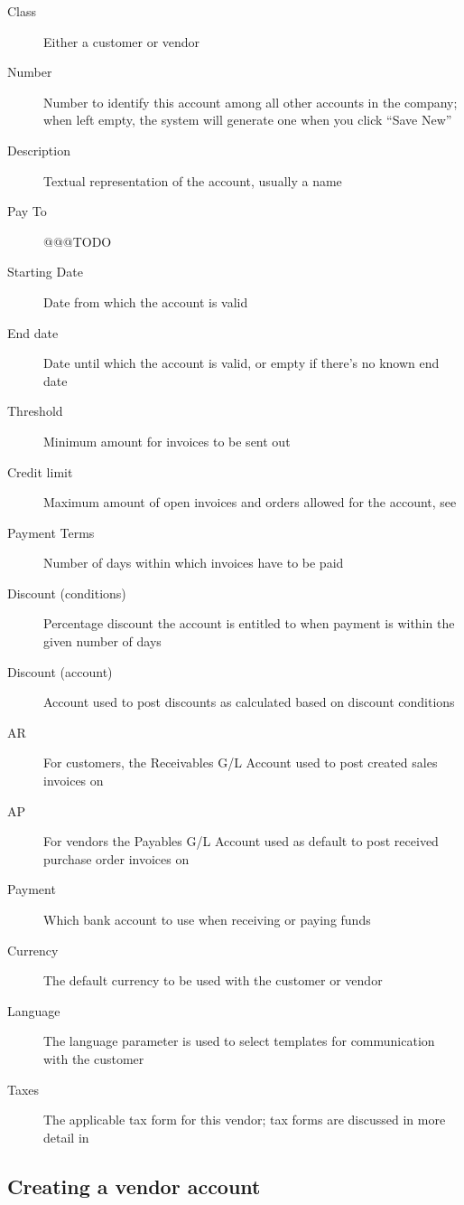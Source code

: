 \begin{description}
\item [Class] Either a \gls{customer} or \gls{vendor} 
\item [Number] Number to identify this account among all other accounts in the company; when left empty, the system will generate one when you click ``Save New''
\item [Description] Textual representation of the account, usually a name
\item [Pay To] @@@TODO
\item [Starting Date] Date from which the account is valid
\item [End date] Date until which the account is valid, or empty if there's no known end date
\item [Threshold] Minimum amount for invoices to be sent out
\item [Credit limit] Maximum amount of open invoices and orders allowed for the account, see 
\item [Payment Terms] Number of days within which invoices have to be paid
\item [Discount (conditions)] Percentage discount the account is entitled to when payment is within the given number of days
\item [Discount (account)] Account used to post discounts as calculated based on discount conditions
\item [AR] For customers, the Receivables G/L Account used to post created sales invoices on
\item [AP] For vendors the Payables G/L Account used as default to post received purchase order invoices on
\item [Payment] Which bank account to use when receiving or paying funds
\item [Currency] The default currency to be used with the \gls{customer} or vendor
\item [Language] The language parameter is used to select templates for communication with the customer
\item [Taxes] The applicable tax form for this vendor; tax forms are discussed in more detail in 
\end{description}

\subsection{Creating a vendor account}
\label{subsec-business-processes-vendors-creating-account}


